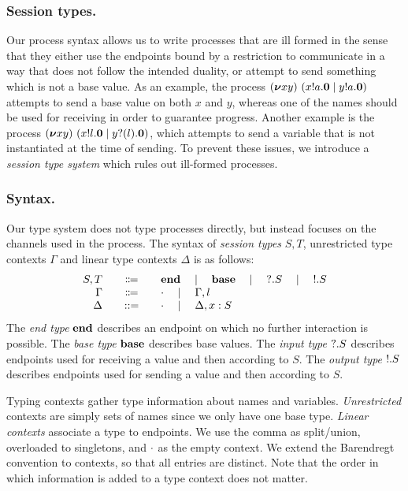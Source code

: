 \documentclass[runningheads]{llncs}
\begin{document}
\subsubsection{Session types.}
Our process syntax allows us to write processes that are ill formed in
the sense that they either use the endpoints bound by a restriction to
communicate in a way that does not follow the intended duality, or
attempt to send something which is not a base value.  As an example,
the process
\( (\bm{\nu} xy)~(x ! a . \bm{0} \mid y ! a . \bm{0}) \)
attempts to send a base value on both \( x \) and \( y\), whereas one
of the names should be used for receiving in order to guarantee
progress.  Another example is the process
\( (\bm{\nu} xy)~(x ! l . \bm{0} \mid y ? (l) . \bm{0}) \),
which attempts to send a variable that is not instantiated at the time
of sending.
%
To prevent these issues, we introduce a \emph{session type system} which
rules out ill-formed processes.

\subsubsection{Syntax.}
Our type system does not type processes directly, but instead focuses on the channels used in the process.
The syntax of \emph{session types} \( S, T \), unrestricted type contexts \( \Gamma \) and linear type contexts \( \Delta \) is as follows:
\[
  \begin{array}{r@{\qquad}c@{\qquad}l}
  S,T & \Coloneqq & \Tend \quad\mid\quad \Tbase \quad\mid\quad \Tin{S} \quad\mid\quad \Tout{S} \\
    \Gamma & \Coloneqq & \Cempty \quad\mid\quad \Gamma, l \\
                    \Delta &::= & \Cempty \quad\mid\quad \Cadd{\Delta}{\hastype{x}{S}}
  \end{array}
\]
The \emph{end type} \( \mathbf{end} \) describes an endpoint on which no further interaction is possible.
The \emph{base type} \( \mathbf{base} \) describes base values.
The \emph{input type} \( {?}.S \) describes endpoints used for receiving a value and then according to \( S \).
The \emph{output type} \( {!}.S \) describes endpoints used for sending a value and then according to \( S \).

Typing contexts gather type information about names and variables.
\emph{Unrestricted} contexts are simply sets of names since we only have one
base type. \emph{Linear contexts} associate a type to endpoints. We use
the comma as split/union, overloaded to singletons, and \( \cdot \) as the
empty context. We extend the Barendregt convention to contexts, so that all
entries are distinct.  Note that the order in which information is added to a
type context does not matter.
\end{document}
